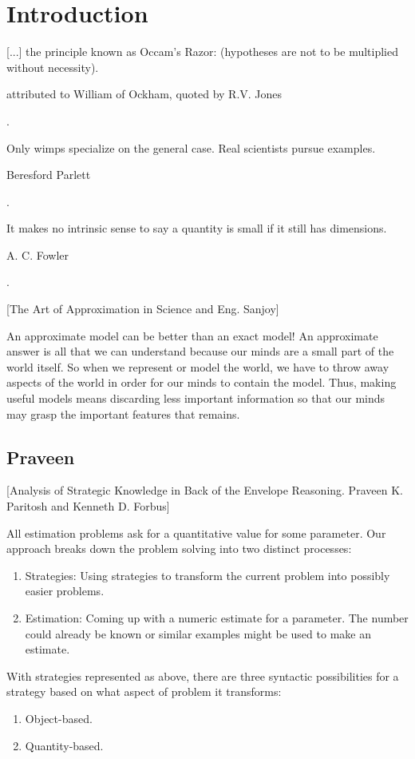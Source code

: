 \section{Introduction}
\newcommand{\lpos}{x} %
\newcommand{\lvel}{v} %
%
\epigraph{[...] the principle known as Occam's Razor:  (hypotheses are not to be multiplied without necessity).}{attributed to William of Ockham, quoted by R.V. Jones}{\citep[p.95]{gibbings:2011}.}
%
\epigraph{Only wimps specialize on the general case. Real scientists pursue examples.}{Beresford Parlett}{\citep{berry:1995}.}
%
\epigraph{It makes no intrinsic sense to say a quantity is small if it still has dimensions.}{A. C. Fowler}{\citep{fowler:2003}.}

[The Art of Approximation in Science and Eng. Sanjoy]

An approximate model can be better than an exact model! An approximate answer is all that we can understand because our minds are a small part of the world itself. So when we represent or model the world, we have to throw away aspects of the world in order for our minds to contain the model. Thus, making useful models means discarding less important information so that our minds may grasp the important features that remains.


\subsection{Praveen}
[Analysis of Strategic Knowledge in Back of the Envelope Reasoning. Praveen K. Paritosh and Kenneth D. Forbus]

All estimation problems ask for a quantitative value for some parameter. Our approach breaks down the problem solving into two distinct processes:
%
\begin{enumerate}
\item Strategies: Using strategies to transform the current problem into possibly easier problems.
\item Estimation: Coming up with a numeric estimate for a parameter. The number could already be known or similar examples might be used to make an estimate.
\end{enumerate}

With strategies represented as above, there are three syntactic possibilities for a strategy based on what aspect of problem it transforms:
%
\begin{enumerate}
\item Object-based.
\item Quantity-based.
\end{enumerate}

